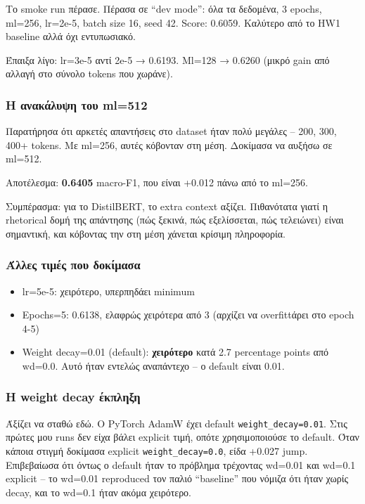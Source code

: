 \documentclass[12pt]{fphw}
\begin{document}
Το smoke run πέρασε. Πέρασα σε ``dev mode'': όλα τα δεδομένα, 3 epochs, ml=256, lr=2e-5, batch size 16, seed 42. Score: 0.6059. Καλύτερο από το HW1 baseline αλλά όχι εντυπωσιακό.

Έπαιξα λίγο: lr=3e-5 αντί 2e-5 → 0.6193. Ml=128 → 0.6260 (μικρό gain από αλλαγή στο σύνολο tokens που χωράνε).

\subsubsection{Η ανακάλυψη του ml=512}

Παρατήρησα ότι αρκετές απαντήσεις στο dataset ήταν πολύ μεγάλες -- 200, 300, 400+ tokens. Με ml=256, αυτές κόβονταν στη μέση. Δοκίμασα να αυξήσω σε ml=512.

Αποτέλεσμα: \textbf{0.6405} macro-F1, που είναι +0.012 πάνω από το ml=256.

Συμπέρασμα: για το DistilBERT, το extra context αξίζει. Πιθανότατα γιατί η rhetorical δομή της απάντησης (πώς ξεκινά, πώς εξελίσσεται, πώς τελειώνει) είναι σημαντική, και κόβοντας την στη μέση χάνεται κρίσιμη πληροφορία.

\subsubsection{Άλλες τιμές που δοκίμασα}

\begin{itemize}
    \item lr=5e-5: χειρότερο, υπερπηδάει minimum
    \item Epochs=5: 0.6138, ελαφρώς χειρότερα από 3 (αρχίζει να overfittάρει στο epoch 4-5)
    \item Weight decay=0.01 (default): \textbf{χειρότερο} κατά 2.7 percentage points από wd=0.0. Αυτό ήταν εντελώς αναπάντεχο -- ο default είναι 0.01.
\end{itemize}

\subsubsection{Η weight decay έκπληξη}

Άξίζει να σταθώ εδώ. Ο PyTorch AdamW έχει default \texttt{weight\_decay=0.01}. Στις πρώτες μου runs δεν είχα βάλει explicit τιμή, οπότε χρησιμοποιούσε το default. Όταν κάποια στιγμή δοκίμασα explicit \texttt{weight\_decay=0.0}, είδα +0.027 jump. Επιβεβαίωσα ότι όντως ο default ήταν το πρόβλημα τρέχοντας wd=0.01 και wd=0.1 explicit -- το wd=0.01 reproduced τον παλιό ``baseline'' που νόμιζα ότι ήταν χωρίς decay, και το wd=0.1 ήταν ακόμα χειρότερο.
\end{document}

